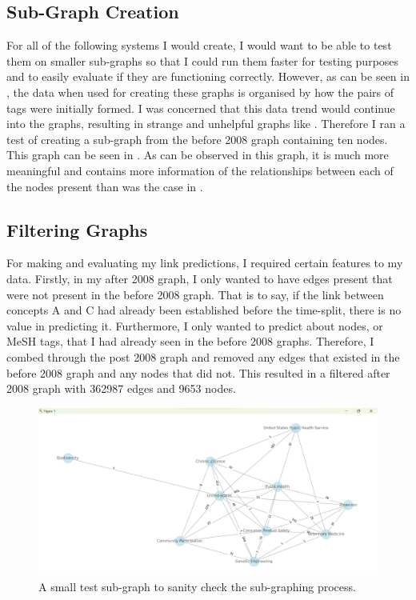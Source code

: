 \documentclass{l4proj}
\begin{document}
\subsection{Sub-Graph Creation} 

For all of the following systems I would create, I would want to be able to test them on smaller sub-graphs so that I could run them faster for testing purposes and to easily evaluate if they are functioning correctly. However, as can be seen in , the data when used for creating these graphs is organised by how the pairs of tags were initially formed. I was concerned that this data trend would continue into the graphs, resulting in strange and unhelpful graphs like . Therefore I ran a test of creating a sub-graph from the before 2008 graph containing ten nodes. This graph can be seen in . As can be observed in this graph, it is much more meaningful and contains more information of the relationships between each of the nodes present than was the case in . \\

\subsection{Filtering Graphs}

For making and evaluating my link predictions, I required certain features to my data. Firstly, in my after 2008 graph, I only wanted to have edges present that were not present in the before 2008 graph. That is to say, if the link between concepts A and C had already been established before the time-split, there is no value in predicting it. Furthermore, I only wanted to predict about nodes, or MeSH tags, that I had already seen in the before 2008 graphs. Therefore, I combed through the post 2008 graph and removed any edges that existed in the before 2008 graph and any nodes that did not. This resulted in a filtered after 2008 graph with 362987 edges and 9653 nodes. \\

\begin{figure}[h]
    \centering
    \includegraphics[width=\linewidth]{images/test_subgraph.png}
    \caption{A small test sub-graph to sanity check the sub-graphing process.}
    \label{fig:test_subgraph}
\end{figure}
\end{document}
